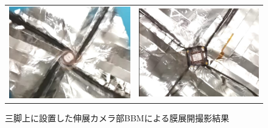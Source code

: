 \begin{figure}[H]
\begin{tabular}{cc}
		\begin{minipage}{0.5\hsize}
			\begin{center}
				\includegraphics[width=1\textwidth]{03/fig/3-9-2-3-4.jpg}
			\end{center}
		\end{minipage}&
		\begin{minipage}{0.5\hsize}
			\begin{center}
				\includegraphics[width=1\textwidth]{03/fig/3-9-2-3-5.jpg}
			\end{center}
		\end{minipage}
	\end{tabular}
	\caption{三脚上に設置した伸展カメラ部BBMによる膜展開撮影結果}
	\label{fig3-9-2-3-2}
\end{figure}

